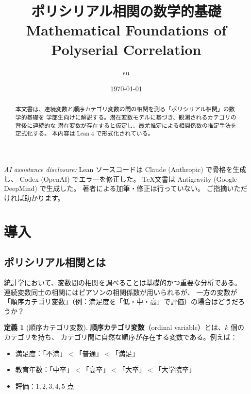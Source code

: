 \documentclass[a4paper,11pt]{ltjsarticle}
\title{%
    \textbf{ポリシリアル相関の数学的基礎}\\[0.5em]
    \Large Mathematical Foundations of Polyserial Correlation
}
\author{su}
\date{\today}
\theoremstyle{definition}
\newtheorem{definition}{定義}[section]
\theoremstyle{plain}
\theoremstyle{remark}
\begin{document}
\maketitle

\begin{center}
\small
\textit{AI assistance disclosure:}
Lean ソースコードは Claude (Anthropic) で骨格を生成し、
Codex (OpenAI) でエラーを修正した。
\TeX 文書は Antigravity (Google DeepMind) で生成した。
著者による加筆・修正は行っていない。
ご指摘いただければ助かります。
\end{center}

\begin{abstract}
本文書は、連続変数と順序カテゴリ変数の間の相関を測る「ポリシリアル相関」の数学的基礎を
学部生向けに解説する。潜在変数モデルに基づき、観測されるカテゴリの背後に連続的な
潜在変数が存在すると仮定し、最尤推定による相関係数の推定手法を定式化する。
本内容は Lean 4 で形式化されている。
\end{abstract}

\tableofcontents

\newpage

\section{導入}

\subsection{ポリシリアル相関とは}

統計学において、変数間の相関を調べることは基礎的かつ重要な分析である。
連続変数同士の相関にはピアソンの相関係数が用いられるが、
一方の変数が「順序カテゴリ変数」（例：満足度を「低・中・高」で評価）の場合はどうだろうか？

\begin{definition}[順序カテゴリ変数]
\textbf{順序カテゴリ変数}（ordinal variable）とは、$k$ 個のカテゴリを持ち、
カテゴリ間に自然な順序が存在する変数である。例えば：
\begin{itemize}
    \item 満足度：「不満」$<$「普通」$<$「満足」
    \item 教育年数：「中卒」$<$「高卒」$<$「大卒」$<$「大学院卒」
    \item 評価：$1, 2, 3, 4, 5$ 点
\end{itemize}
\end{definition}
\end{document}
